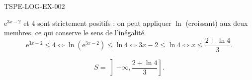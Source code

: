\begin{corrige}{TSPE-LOG-EX-002}

$\mathrm{e}^{3x-2}$ et $4$ sont strictement positifs : on peut appliquer $\ln$ (croissant) aux deux membres, ce qui conserve le sens de l'inégalité.
\[
  \mathrm{e}^{3x-2} \leq 4 \iff \ln\!\left(\mathrm{e}^{3x-2}\right) \leq \ln 4 \iff 3x - 2 \leq \ln 4 \iff x \leq \frac{2+\ln 4}{3}.
\]

\[
  \boxed{S = \left]-\infty, \dfrac{2+\ln 4}{3}\right]}.
\]

\end{corrige}
